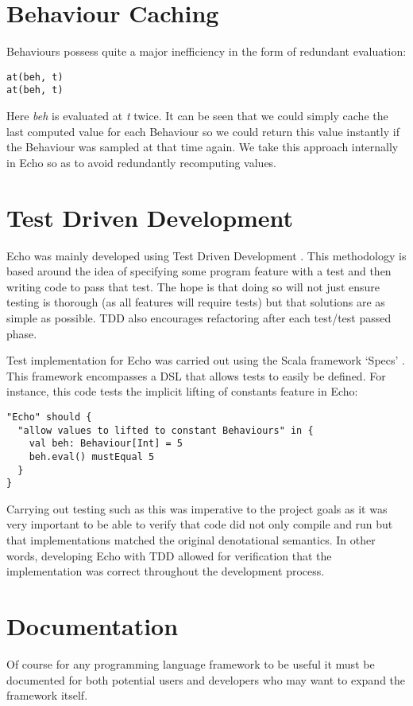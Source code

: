   \section{Behaviour Caching}
    \label{sec:caching}
    Behaviours possess quite a major inefficiency in the form of redundant evaluation:

\begin{verbatim}
at(beh, t)
at(beh, t)
\end{verbatim}  

    Here \emph{beh} is evaluated at \emph{t} twice. It can be seen that we could simply cache the last
    computed value for each Behaviour so we could return this value instantly if the Behaviour was sampled at that time 
    again.
    We take this approach internally in Echo so as to avoid redundantly recomputing values. 
  
  \section{Test Driven Development}
    Echo was mainly developed using Test Driven Development \cite{Cunningham}. This methodology is based around the idea
    of specifying some program feature with a test and then writing code to pass that test. The hope
    is that doing so will not just ensure testing is thorough (as all features will require tests) but
    that solutions are as simple as possible. TDD also encourages
    refactoring after each test/test passed phase.

    Test implementation for Echo was carried out using the Scala framework `Specs' \cite{EricTorreborre}. This framework
    encompasses a DSL that allows tests to easily be defined. For instance, this code tests the implicit lifting
    of constants feature in Echo:

\begin{verbatim}
"Echo" should {
  "allow values to lifted to constant Behaviours" in {
    val beh: Behaviour[Int] = 5
    beh.eval() mustEqual 5
  }
}
\end{verbatim}

    Carrying out testing such as this was imperative to the project goals as it was very important to be able
    to verify that code did not only compile and run but that implementations matched the original denotational 
    semantics. In other words, developing Echo with TDD allowed for verification that the implementation
    was correct throughout the development process.
    
  \section{Documentation}
    Of course for any programming language framework to be useful it must be documented for both potential users
    and developers who may want to expand the framework itself. 
    
